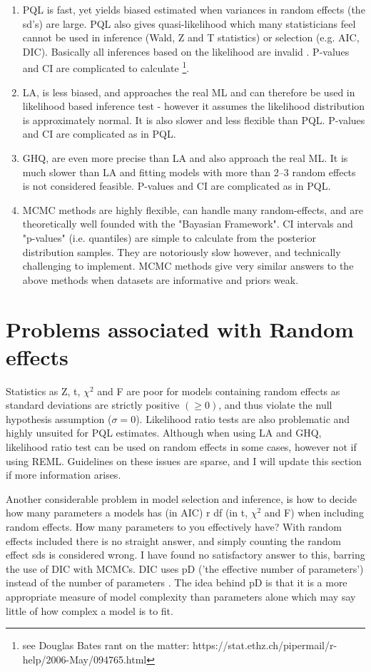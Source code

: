 \documentclass{article}\usepackage[]{graphicx}\usepackage[]{color}
\numberwithin{equation}{section} %
\numberwithin{figure}{section} %
\numberwithin{table}{section} %
\begin{document}
\begin{enumerate}
\item PQL is fast, yet yields biased estimated when variances in random effects (the sd's) are large. PQL also gives quasi-likelihood which many statisticians feel cannot be used in inference (Wald, Z and T statistics) or selection (e.g. AIC, DIC). Basically all inferences based on the likelihood are invalid \citep{Joe2008}. P-values and CI are complicated to calculate \footnote{see Douglas Bates rant on the matter: https://stat.ethz.ch/pipermail/r-help/2006-May/094765.html}.
\item LA, is less biased, and approaches the real ML and can therefore be used in likelihood based inference test - however it assumes the likelihood distribution is approximately normal. It is also slower and less flexible than PQL. P-values and CI are complicated as in PQL.
\item GHQ, are even more precise than LA and also approach the real ML. It is much slower than LA and fitting models with more than 2–3 random effects is not considered feasible. P-values and CI are complicated as in PQL.
\item MCMC methods are highly flexible, can handle many random-effects, and are theoretically well founded with the "Bayasian Framework". CI intervals and "p-values" (i.e. quantiles) are simple to calculate from the posterior distribution samples. They are notoriously slow however, and technically challenging to implement. MCMC methods give very similar answers to the above methods when datasets are informative and priors weak.
\end{enumerate}

\section{Problems associated with Random effects}

Statistics as Z, t, $\chi^2$ and F are poor for models containing random effects as standard deviations are strictly positive $(\geq 0)$, and thus violate the null hypothesis assumption ($\sigma = 0$). Likelihood ratio tests are also problematic and highly unsuited for PQL estimates. Although when using LA and GHQ, likelihood ratio test can be used on random effects in some cases, however not if using REML. Guidelines on these issues are sparse, and I will update this section if more information arises.

Another considerable problem in model selection and inference, is how to decide how many parameters a models has (in AIC) r df (in t, $\chi^2$ and F) when including random effects. How many parameters to you effectively have? With random effects included there is no straight answer, and simply counting the random effect sds is considered wrong. I have found no satisfactory answer to this, barring the use of DIC with MCMCs. DIC uses pD ('the effective number of parameters') instead of the number of parameters \citep{Spiegelhalter2002}. The idea behind pD is that it is a more appropriate measure of model complexity than parameters alone which may say little of how complex a model is to fit. 
\end{document}
